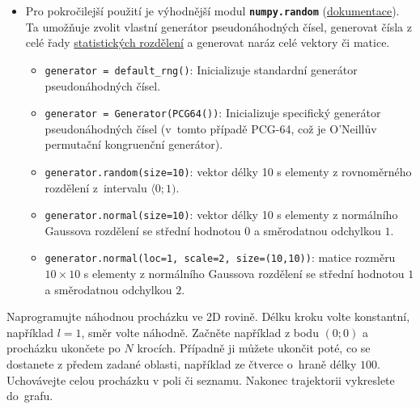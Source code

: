 \documentclass[a4paper,11pt,twoside]{article}
\def\code#1{\textnormal{\texttt{#1}}}
\def\file#1{\textnormal{\textbf{\texttt{#1}}}}
\begin{document}
{\begin{itemize}
            \item 
                Pro pokročilejší použití je výhodnější modul \file{numpy.random} (\href{https://docs.python.org/3/library/random.html}{dokumentace}).
                Ta umožňuje zvolit vlastní generátor pseudonáhodných čísel, generovat čísla z celé řady \href{https://numpy.org/doc/1.18/reference/random/generator.html}{statistických rozdělení} a generovat naráz celé vektory či matice.
                \begin{itemize}
                    \item \code{generator = default\_rng()}: Inicializuje standardní generátor pseudonáhodných čísel.
                    \item \code{generator = Generator(PCG64())}: Inicializuje specifický generátor pseudonáhodných čísel (v~tomto případě PCG-64, což je O'Neillův permutační kongruenční generátor).
                    \item \code{generator.random(size=10)}: vektor délky 10 s elementy z rovnoměrného rozdělení z~intervalu $\langle 0;1)$.
                    \item \code{generator.normal(size=10)}: vektor délky 10 s elementy z normálního Gaussova rozdělení se střední hodnotou $0$ a směrodatnou odchylkou $1$.
                    \item \code{generator.normal(loc=1, scale=2, size=(10,10))}: matice rozměru $10\times10$ s elementy z normálního Gaussova rozdělení se střední hodnotou $1$ a směrodatnou odchylkou $2$.
                \end{itemize} 
        \end{itemize}
    }

    \begin{task}
        Naprogramujte náhodnou procházku ve 2D rovině.
        Délku kroku volte konstantní, například $l=1$, směr volte náhodně.
        Začněte například z bodu $(0;0)$ a procházku ukončete po $N$ krocích.
        Případně ji můžete ukončit poté, co se dostanete z předem zadané oblasti, například ze čtverce o~hraně délky $100$.
        Uchovávejte celou procházku v poli či seznamu. 
        Nakonec trajektorii vykreslete do~grafu.
    \end{task}
\end{document}
